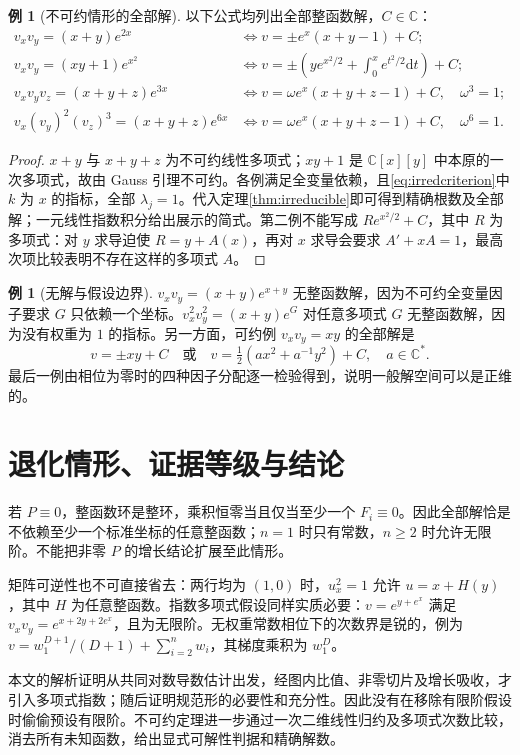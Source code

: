 \documentclass[UTF8,11pt,a4paper,fontset=fandol]{ctexart}
\theoremstyle{definition}\newtheorem{definition}[theorem]{定义}
\newtheorem{example}[theorem]{例}
\theoremstyle{remark}\newtheorem{remark}[theorem]{注}
\newcommand{\C}{\mathbb C}\newcommand{\N}{\mathbb N}
\newcommand{\dd}{\mathrm d}\newcommand{\OO}{\mathcal O}
\begin{document}
\begin{example}[不可约情形的全部解]
以下公式均列出全部整函数解，$C\in\C$：
\begin{align*}
v_xv_y=(x+y)e^{2x}
&\iff v=\pm e^x(x+y-1)+C;\\
v_xv_y=(xy+1)e^{x^2}
&\iff v=\pm\left(ye^{x^2/2}+\int_0^x e^{t^2/2}\dd t\right)+C;\\
v_xv_yv_z=(x+y+z)e^{3x}
&\iff v=\omega e^x(x+y+z-1)+C,\quad\omega^3=1;\\
v_x(v_y)^2(v_z)^3=(x+y+z)e^{6x}
&\iff v=\omega e^x(x+y+z-1)+C,\quad\omega^6=1.
\end{align*}
\end{example}
\begin{proof}
$x+y$ 与 $x+y+z$ 为不可约线性多项式；$xy+1$ 是 $\C[x][y]$ 中本原的一次多项式，故由 Gauss 引理不可约。各例满足全变量依赖，且\eqref{eq:irredcriterion}中 $k$ 为 $x$ 的指标，全部 $\lambda_j=1$。代入定理\ref{thm:irreducible}即可得到精确根数及全部解；一元线性指数积分给出展示的简式。第二例不能写成 $Re^{x^2/2}+C$，其中 $R$ 为多项式：对 $y$ 求导迫使 $R=y+A(x)$，再对 $x$ 求导会要求 $A' +xA=1$，最高次项比较表明不存在这样的多项式 $A$。
\end{proof}

\begin{example}[无解与假设边界]
$v_xv_y=(x+y)e^{x+y}$ 无整函数解，因为不可约全变量因子要求 $G$ 只依赖一个坐标。$v_x^2v_y^2=(x+y)e^{G}$ 对任意多项式 $G$ 无整函数解，因为没有权重为 $1$ 的指标。另一方面，可约例 $v_xv_y=xy$ 的全部解是
\[
v=\pm xy+C\quad\text{或}\quad
v=\tfrac12(ax^2+a^{-1}y^2)+C,\quad a\in\C^*.
\]
最后一例由相位为零时的四种因子分配逐一检验得到，说明一般解空间可以是正维的。
\end{example}

\section{退化情形、证据等级与结论}\label{sec:boundary}
若 $P\equiv0$，整函数环是整环，乘积恒零当且仅当至少一个 $F_i\equiv0$。因此全部解恰是不依赖至少一个标准坐标的任意整函数；$n=1$ 时只有常数，$n\ge2$ 时允许无限阶。不能把非零 $P$ 的增长结论扩展至此情形。

矩阵可逆性也不可直接省去：两行均为 $(1,0)$ 时，$u_x^2=1$ 允许 $u=x+H(y)$，其中 $H$ 为任意整函数。指数多项式假设同样实质必要：$v=e^{y+e^x}$ 满足 $v_xv_y=e^{x+2y+2e^x}$，且为无限阶。无权重常数相位下的次数界是锐的，例为 $v=w_1^{D+1}/(D+1)+\sum_{i=2}^n w_i$，其梯度乘积为 $w_1^D$。

本文的解析证明从共同对数导数估计出发，经图内比值、非零切片及增长吸收，才引入多项式指数；随后证明规范形的必要性和充分性。因此没有在移除有限阶假设时偷偷预设有限阶。不可约定理进一步通过一次二维线性归约及多项式次数比较，消去所有未知函数，给出显式可解性判据和精确解数。
\end{document}
